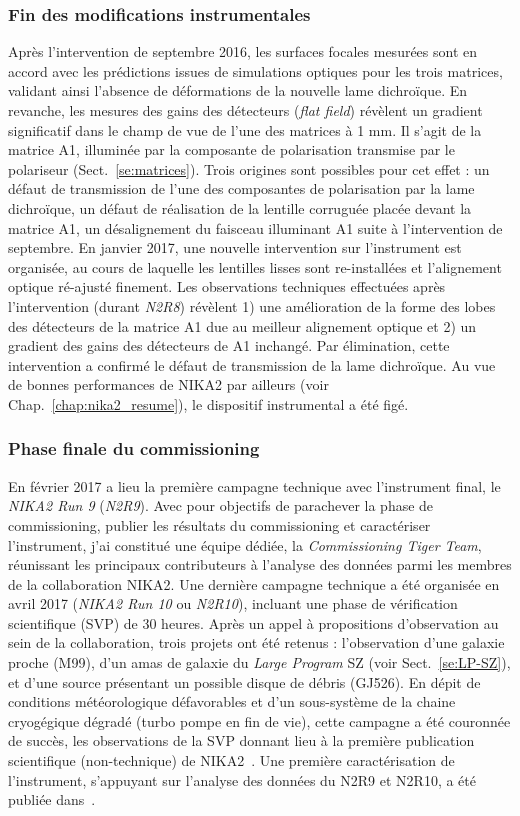 \subsubsection{Fin des modifications instrumentales}
Après l'intervention de septembre 2016, les surfaces focales mesurées
sont en accord avec les prédictions issues de simulations optiques pour
les trois matrices, validant ainsi l'absence de déformations de la
nouvelle lame dichroïque. En revanche, les mesures des gains des
détecteurs (\emph{flat field}) révèlent un gradient significatif dans
le champ de vue de l'une des matrices à 1 mm. Il s'agit de la matrice
A1, illuminée par la composante de polarisation transmise par le
polariseur (Sect.~\ref{se:matrices}). Trois origines sont possibles
pour cet effet : un défaut de transmission de l'une des composantes de
polarisation par la lame dichroïque, un défaut de réalisation de la
lentille corruguée placée devant la matrice A1, un désalignement du
faisceau illuminant A1 suite à l'intervention de septembre. En janvier
2017, une nouvelle intervention sur l'instrument est organisée, au
cours de laquelle les lentilles lisses sont re-installées et
l'alignement optique ré-ajusté finement. Les observations techniques
effectuées après l'intervention (durant \emph{N2R8}) révèlent 1) une
amélioration de la forme des lobes des détecteurs de la matrice A1 due
au meilleur alignement optique et 2) un gradient des gains des
détecteurs de A1 inchangé. Par élimination, cette intervention a
confirmé le défaut de transmission de la lame dichroïque. Au vue de
bonnes performances de NIKA2 par ailleurs (voir Chap.~\ref{chap:nika2_resume}),
le dispositif instrumental a été figé.

\subsubsection{Phase finale du commissioning}
En février 2017 a lieu la première campagne technique avec
l'instrument final, le \emph{NIKA2 Run 9} (\emph{N2R9}). Avec pour
objectifs de parachever la phase de commissioning, publier les
résultats du commissioning et caractériser l'instrument, j'ai
constitué une équipe dédiée, la \emph{Commissioning Tiger Team},
réunissant les principaux contributeurs à l'analyse des données parmi
les membres de la collaboration NIKA2. Une dernière campagne technique
a été organisée en avril 2017 (\emph{NIKA2 Run 10} ou \emph{N2R10}),
incluant une phase de vérification scientifique (SVP) de 30
heures. Après un appel à propositions d'observation
au sein de la collaboration, trois projets ont été retenus :
l'observation d'une galaxie proche (M99), d'un amas de galaxie du
\emph{Large Program} SZ (voir Sect.~\ref{se:LP-SZ}), et d'une source
présentant un possible disque de débris (GJ526). En dépit de
conditions météorologique défavorables et d'un sous-système de la
chaine cryogégique dégradé (turbo pompe en fin de vie), cette campagne
a été couronnée de succès, les observations de la SVP donnant lieu à
la première publication scientifique (non-technique) de
NIKA2~\citep{Ruppin2018}. Une première caractérisation de l'instrument,
s'appuyant sur l'analyse des données du N2R9 et N2R10, a été publiée
dans~\citet{Adam2018}.

